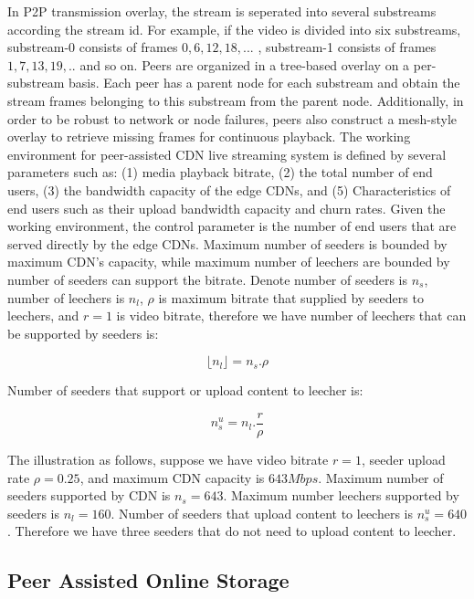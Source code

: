 \documentclass[conference]{IEEEtran}
\begin{document}
In P2P transmission overlay, the stream is seperated into several substreams according the stream id.
For example, if the video is divided into six substreams, substream-0 consists of frames $0,6,12,18,...$ , substream-1 consists of frames $1,7,13,19,..$ and so on. 
Peers are organized in a tree-based overlay on a per-substream basis.
Each peer has a parent node for each substream and obtain the stream frames belonging to this substream from the parent node. 
Additionally, in order to be robust to network or node failures, peers also construct a mesh-style overlay to retrieve missing frames for continuous playback.
The working environment for peer-assisted CDN live streaming system is defined by several parameters such as: (1) media playback bitrate, (2) the total number of end users, (3) the bandwidth capacity of the edge CDNs, and (5) Characteristics of end users such as their upload bandwidth capacity and churn rates. 
Given the working environment, the control parameter is the number of end users that are served directly by the edge CDNs.
Maximum number of seeders is bounded by maximum CDN's capacity, while maximum number of leechers are bounded by number of seeders can support the bitrate.
Denote number of seeders is $n_s$, number of leechers is $n_l$, $\rho$ is maximum bitrate that supplied by seeders to leechers, and $r=1$ is video bitrate, therefore we have number of leechers that can be supported by seeders is:

\begin{equation}\label{eqn:leecher}
	\lfloor n_l \rfloor = n_s . \rho
\end{equation}

Number of seeders that support or upload content to leecher is:

\begin{equation}\label{eqn:seeders-to-leechers}
	n_{s}^{u} = n_l . \frac{r}{\rho}
\end{equation}

The illustration as follows, suppose we have video bitrate $r=1$, seeder upload rate $\rho=0.25$, and maximum CDN capacity is $643Mbps$. 
Maximum number of seeders supported by CDN is $n_s=643$.
Maximum number leechers supported by seeders is $n_l=160$.  
Number of seeders that upload content to leechers is $n_{s}^{u}=640$.  
Therefore we have three seeders that do not need to upload content to leecher. 

\subsection{Peer Assisted Online Storage}
\end{document}
